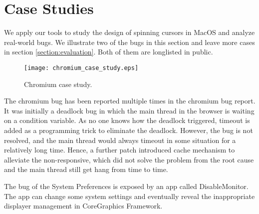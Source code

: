 \section{Case Studies} \label{sec:casestudy}
We apply our tools to study the design of spinning cursors in MacOS and analyze real-world bugs.
We illustrate two of the bugs in this section and leave more cases in section \ref{section:evaluation}.
Both of them are longlisted in public.

\begin{figure}[tb]
    \centering
    \texttt{[image: chromium\_case\_study.eps]}
    \caption{Chromium case study.}
    \label{fig:chromium-trace}
\end{figure}



The chromium bug has been reported multiple times in the chromium bug report.
It was initially a deadlock bug in which the main thread in the browser is waiting on a condition variable.
As no one knows how the deadlock triggered, timeout is added as a programming trick to eliminate the deadlock.
However, the bug is not resolved, and the main thread would always timeout in some situation for a relatively long time.
Hence, a further patch introduced cache mechanism to alleviate the non-responsive, which did not solve the problem from the root cause and the main thread still get hang from time to time.

The bug of the System Preferences is exposed by an app called DisableMonitor.
The app can change some system settings and eventually reveal the inappropriate displayer management in CoreGraphics Framework.




